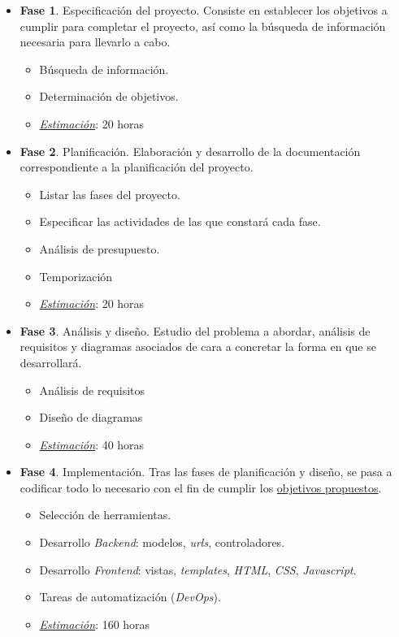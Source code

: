 \begin{itemize}
	\item \textbf{Fase 1}. Especificación del proyecto. Consiste en establecer los objetivos a cumplir para completar el proyecto, así como la búsqueda de información necesaria para llevarlo a cabo.
	\begin{itemize}
		\item Búsqueda de información.
		\item Determinación de objetivos.
		\item \underline{\textit{Estimación}}: 20 horas
	\end{itemize}
	
	\item \textbf{Fase 2}. Planificación. Elaboración y desarrollo de la documentación correspondiente a la planificación del proyecto.
	\begin{itemize}
		\item Listar las fases del proyecto.
		\item Especificar las actividades de las que constará cada fase.
		\item Análisis de presupuesto.
		\item Temporización
		\item \underline{\textit{Estimación}}: 20 horas
	\end{itemize}
	
	\item \textbf{Fase 3}. Análisis y diseño. Estudio del problema a abordar, análisis de requisitos y diagramas asociados de cara a concretar la forma en que se desarrollará.
	\begin{itemize}
		\item Análisis de requisitos
		\item Diseño de diagramas
		\item \underline{\textit{Estimación}}: 40 horas
	\end{itemize}
	
	\item \textbf{Fase 4}. Implementación. Tras las fases de planificación y diseño, se pasa a codificar todo lo necesario con el fin de cumplir los \hyperref[cap:objetivos]{objetivos propuestos}.
	\begin{itemize}
		\item Selección de herramientas.
		\item Desarrollo \textit{Backend}: modelos, \textit{urls}, controladores.
		\item Desarrollo \textit{Frontend}: vistas, \textit{templates}, \textit{HTML}, \textit{CSS}, \textit{Javascript}.
		\item Tareas de automatización (\textit{DevOps}).
		\item \underline{\textit{Estimación}}: 160 horas
	\end{itemize}
	

\end{itemize}
